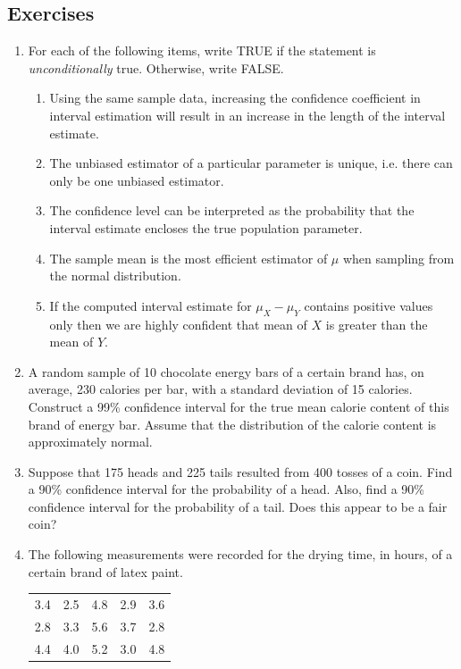 \documentclass{article}
\begin{document}
\subsection{Exercises}
\begin{enumerate}
    \item For each of the following items, write TRUE if the statement is \textit{unconditionally} true. Otherwise, write FALSE.
    \begin{enumerate}
        \item Using the same sample data, increasing the confidence coefficient in interval estimation will result in an increase in the length of the interval estimate.
	\item The unbiased estimator of a particular parameter is unique, i.e. there can only be one unbiased estimator.
	\item The confidence level can be interpreted as the probability that the interval estimate encloses the true population parameter.
	\item The sample mean is the most efficient estimator of $\mu$ when sampling from the normal distribution.
	\item If the computed interval estimate for $\mu_X-\mu_Y$ contains positive values only then we are highly confident that mean of $X$ is greater than the mean of $Y$.
    \end{enumerate}
    \item A random sample of 10 chocolate energy bars of a certain brand has, on average, 230 calories per bar, with a standard deviation of 15 calories. Construct a 99\% confidence interval for the true mean calorie content of this brand of energy bar. Assume that the distribution of the calorie content is approximately normal.
    \item Suppose that 175 heads and 225 tails resulted from 400 tosses of a coin.  Find a 90\% confidence interval for the probability of a head. Also, find a 90\% confidence interval for the probability of a tail.  Does this appear to be a fair coin?
    \item The following measurements were recorded for the drying time, in hours, of a certain brand of latex paint.
    \begin{table}[H]
    \begin{tabular}{lllll}
    3.4 & 2.5 & 4.8 & 2.9 & 3.6 \\
    2.8 & 3.3 & 5.6 & 3.7 & 2.8 \\
    4.4 & 4.0 & 5.2 & 3.0 & 4.8
    \end{tabular}

\end{table}
\end{enumerate}
\end{document}
